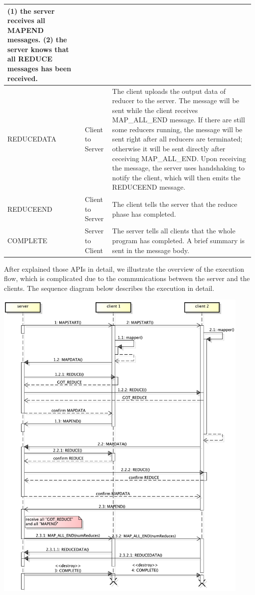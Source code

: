 \begin{center}
\begin{tabular}{| l | l | p{7.5cm} |}
(1) the server receives all MAPEND messages. \newline
(2) the server knows that all REDUCE messages has been received. \\
\hline
REDUCEDATA & Client to Server & The client uploads the output data of reducer to the server. \newline
The message will be sent while the client receives MAP\_ALL\_END message. If there are still some reducers running, the message will be sent right after all reducers are terminated; otherwise it will be sent directly after ceceiving MAP\_ALL\_END. \newline
Upon receiving the message, the server uses handshaking to notify the client, which will then emits the REDUCEEND message. \\
\hline
REDUCEEND & Client to Server & The client tells the server that the reduce phase has completed. \\
\hline
COMPLETE & Server to Client & The server tells all clients that the whole program has completed. A brief summary is sent in the message body. \\
\hline

\end{tabular}

\end{center}

After explained those APIs in detail, we illustrate the overview of the execution flow, which is complicated due to the communications between the server and the clients. The sequence diagram below describes the execution in detail.

\includegraphics[width=12.5cm, keepaspectratio=true]{JSMP.png}
